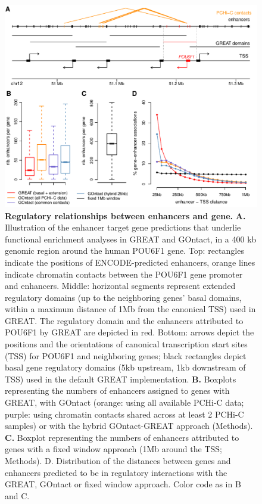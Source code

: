 \begin{figure}[hbt!]
    \centering
    \includegraphics[width=1\textwidth, page=1] {figures/GOntact/Figure1.pdf}
    \caption[Regulatory relationships between enhancers and gene.]{
    \textbf{Regulatory relationships between enhancers and gene.}
    \textbf{A.} Illustration of the enhancer target gene predictions that underlie functional enrichment analyses in GREAT and GOntact, in a 400 kb genomic region around the human POU6F1 gene. Top: rectangles indicate the positions of ENCODE-predicted enhancers, orange lines indicate chromatin contacts between the POU6F1 gene promoter and enhancers. Middle: horizontal segments represent extended regulatory domains (up to the neighboring genes’ basal domains, within a maximum distance of 1Mb from the canonical TSS) used in GREAT. The regulatory domain and the enhancers attributed to POU6F1 by GREAT are depicted in red. Bottom: arrows depict the positions and the orientations of canonical transcription start sites (TSS) for POU6F1 and neighboring genes; black rectangles depict basal gene regulatory domains (5kb upstream, 1kb downstream of TSS) used in the default GREAT implementation.  
    \textbf{B.} Boxplots representing the numbers of enhancers assigned to genes with GREAT, with GOntact (orange: using all available PCHi-C data; purple: using chromatin contacts shared across at least 2 PCHi-C samples) or with the hybrid GOntact-GREAT approach (Methods). 
    \textbf{C.} Boxplot representing the numbers of enhancers attributed to genes with a fixed window approach (1Mb around the TSS; Methods). D. Distribution of the distances between genes and enhancers predicted to be in regulatory interactions with the GREAT, GOntact or fixed window approach. Color code as in B and C.
    \\
    }
    \label{fig:GOntact-fig1}
\end{figure} 

